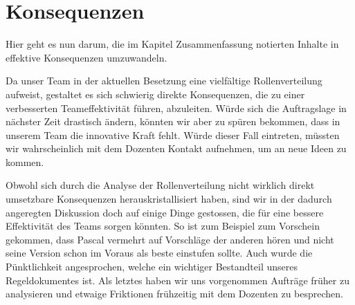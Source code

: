 
\chapter{Konsequenzen}

Hier geht es nun darum, die im Kapitel Zusammenfassung notierten Inhalte in effektive Konsequenzen umzuwandeln.

Da unser Team in der aktuellen Besetzung eine vielfältige Rollenverteilung aufweist, gestaltet es sich schwierig direkte Konsequenzen, die zu einer verbesserten Teameffektivität führen, abzuleiten. Würde sich die Auftragslage in nächster Zeit drastisch ändern, könnten wir aber zu spüren bekommen, dass in unserem Team die innovative Kraft fehlt. Würde dieser Fall eintreten, müssten wir wahrscheinlich mit dem Dozenten Kontakt aufnehmen, um an neue Ideen zu kommen. 

Obwohl sich durch die Analyse der Rollenverteilung nicht wirklich direkt umsetzbare Konsequenzen herauskristallisiert haben, sind wir in der dadurch angeregten Diskussion doch auf einige Dinge gestossen, die für eine bessere Effektivität des Teams sorgen könnten.
So ist zum Beispiel zum Vorschein gekommen, dass Pascal vermehrt auf Vorschläge der anderen hören und nicht seine Version schon im Voraus als beste einstufen sollte. Auch wurde die Pünktlichkeit angesprochen, welche ein wichtiger Bestandteil unseres Regeldokumentes ist. Als letztes haben wir uns vorgenommen Aufträge früher zu analysieren und etwaige Friktionen frühzeitig mit dem Dozenten zu besprechen.